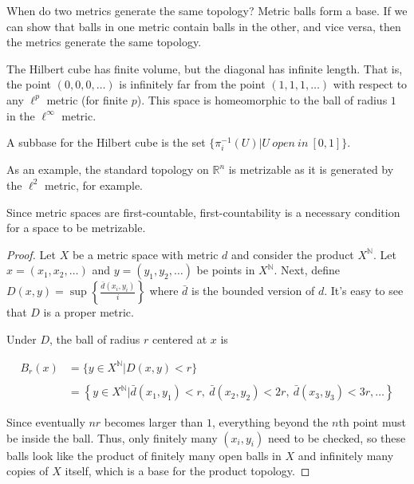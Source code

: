 When do two metrics generate the same topology?  Metric balls form a base.  If we can show that balls in one metric contain balls in the other, and vice versa, then the metrics generate the same topology.


The Hilbert cube has finite volume, but the diagonal has infinite length.  That is, the point $(0,0,0,\dots)$ is infinitely far from the point $(1,1,1,\dots)$ with respect to any $\ell^p$ metric (for finite $p$).  This space is homeomorphic to the ball of radius $1$ in the $\ell^\infty$ metric.

A subbase for the Hilbert cube is the set $\{ \pi_i^{-1}(U) | U \ open \ in \ [0,1] \}$.


As an example, the standard topology on $\mathbb{R}^n$ is metrizable as it is generated by the $\ell^2$ metric, for example.

Since metric spaces are first-countable, first-countability is a necessary condition for a space to be metrizable.



\begin{proof}
	
	Let $X$ be a metric space with metric $d$ and consider the product $X^\mathbb{N}$.  Let $x=(x_1,x_2,\dots)$ and $y=(y_1,y_2,\dots)$ be points in $X^\mathbb{N}$.  Next, define $D(x,y) = \sup\left\{\frac{\bar{d}(x_i,y_i)}{i}\right\}$ where $\bar{d}$ is the bounded version of $d$.  It's easy to see that $D$ is a proper metric.
	
	Under $D$, the ball of radius $r$ centered at $x$ is 
	
\begin{align*}
B_r(x) &= \{ y\in X^\mathbb{N} | D(x,y)<r   \}\\
\ \\
&= \left\{  y\in X^\mathbb{N} | \bar{d}(x_1,y_1) < r ,\ \bar{d}(x_2,y_2) < 2r, \ \bar{d}(x_3,y_3)<3r,\dots              \right\}
\end{align*}
	
Since eventually $nr$ becomes larger than $1$, everything beyond the $n$th point must be inside the ball.  Thus, only finitely many $(x_i,y_i)$ need to be checked, so these balls look like the product of finitely many open balls in $X$ and infinitely many copies of $X$ itself, which is a base for the product topology.
	
\end{proof}